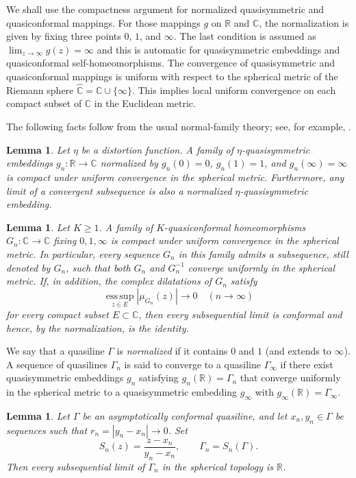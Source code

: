 \documentclass[10pt,a4paper]{amsart}
\numberwithin{equation}{section}
\newtheorem{lemma}[theorem]{Lemma}
\newcommand{\R}{\mathbb{R}}
\newcommand{\C}{\mathbb{C}}
\newcommand{\esssup}{\operatorname*{ess\,sup}}
\begin{document}
We shall use the compactness argument for normalized quasisymmetric and quasiconformal mappings.
For those mappings $g$ on $\mathbb R$ and $\mathbb C$, the normalization is given by fixing three points $0$, $1$, and $\infty$.
The last condition is assumed as $\lim_{z \to \infty} g(z)=\infty$ and this is automatic for
quasisymmetric embeddings and quasiconformal self-homeomorphisms.
The convergence of quasisymmetric and quasiconformal mappings is uniform with respect to the spherical metric of 
the Riemann sphere $\widehat{\mathbb C}=\mathbb C \cup \{\infty\}$.
This implies local uniform convergence on each compact subset of $\mathbb C$ in the Euclidean metric.

The following facts follow from the usual normal-family theory; see, for example,
\cite{Ahlfors,VaisalaQC}.

\begin{lemma}\label{lem:normal-boundary}
Let $\eta$ be a distortion function. 
A family of $\eta$-quasisymmetric embeddings $g_n\colon\R\to\C$ normalized by $g_n(0)=0$, $g_n(1)=1$, and
$g_n(\infty)=\infty$ is compact under uniform convergence in the spherical metric. 
Furthermore, any limit of a convergent subsequence is also a normalized $\eta$-quasisymmetric embedding.
\end{lemma}

\begin{lemma}\label{lem:normal-qc}
Let $K\ge1$. 
A family of $K$-quasiconformal homeomorphisms $G_n\colon\C\to\C$ fixing $0,1,\infty$ is compact under uniform convergence in the spherical metric. 
In particular, every sequence $G_n$ in this family admits a subsequence, still denoted by $G_n$, such that both $G_n$ and $G_n^{-1}$ converge uniformly in the spherical metric.
If, in addition, the complex dilatations of $G_n$ satisfy
\[
 \esssup_{z\in E}|\mu_{G_n}(z)|\to 0 \quad(n \to \infty)
\]
for every compact subset $E\subset\C$, then every subsequential limit is conformal and hence, by the normalization, is the identity.
\end{lemma}

We say that a quasiline $\Gamma$ is \emph{normalized} if it contains $0$ and $1$ (and extends to $\infty$). 
A sequence of quasilines $\Gamma_n$ is said to converge to a quasiline $\Gamma_\infty$ if there exist quasisymmetric embeddings $g_n$ satisfying $g_n(\mathbb R) = \Gamma_n$ that converge uniformly in the spherical metric to a quasisymmetric embedding $g_\infty$ with $g_\infty(\mathbb R) = \Gamma_\infty$.

\begin{lemma}\label{lem:symmetric-blowup}
Let $\Gamma$ be an asymptotically conformal quasiline, and let $x_n, y_n \in \Gamma$ be sequences such that $r_n = |y_n-x_n| \to 0$.
Set
\[
 S_n(z)=\frac{z-x_n}{y_n-x_n}, \qquad \Gamma_n=S_n(\Gamma).
\]
Then every subsequential limit of $\Gamma_n$ in the spherical topology is $\R$.
\end{lemma}
\end{document}
